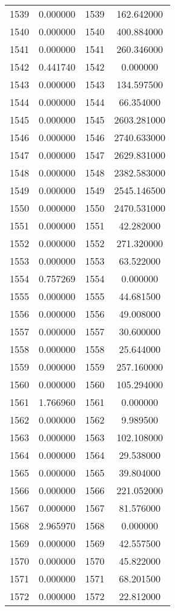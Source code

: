 \documentclass[12pt]{article}
\begin{document}
\begin{longtable}{@{}cccc@{}}
1539 & 0.000000 & 1539 & 162.642000 \\
1540 & 0.000000 & 1540 & 400.884000 \\
1541 & 0.000000 & 1541 & 260.346000 \\
1542 & 0.441740 & 1542 & 0.000000 \\
1543 & 0.000000 & 1543 & 134.597500 \\
1544 & 0.000000 & 1544 & 66.354000 \\
1545 & 0.000000 & 1545 & 2603.281000 \\
1546 & 0.000000 & 1546 & 2740.633000 \\
1547 & 0.000000 & 1547 & 2629.831000 \\
1548 & 0.000000 & 1548 & 2382.583000 \\
1549 & 0.000000 & 1549 & 2545.146500 \\
1550 & 0.000000 & 1550 & 2470.531000 \\
1551 & 0.000000 & 1551 & 42.282000 \\
1552 & 0.000000 & 1552 & 271.320000 \\
1553 & 0.000000 & 1553 & 63.522000 \\
1554 & 0.757269 & 1554 & 0.000000 \\
1555 & 0.000000 & 1555 & 44.681500 \\
1556 & 0.000000 & 1556 & 49.008000 \\
1557 & 0.000000 & 1557 & 30.600000 \\
1558 & 0.000000 & 1558 & 25.644000 \\
1559 & 0.000000 & 1559 & 257.160000 \\
1560 & 0.000000 & 1560 & 105.294000 \\
1561 & 1.766960 & 1561 & 0.000000 \\
1562 & 0.000000 & 1562 & 9.989500 \\
1563 & 0.000000 & 1563 & 102.108000 \\
1564 & 0.000000 & 1564 & 29.538000 \\
1565 & 0.000000 & 1565 & 39.804000 \\
1566 & 0.000000 & 1566 & 221.052000 \\
1567 & 0.000000 & 1567 & 81.576000 \\
1568 & 2.965970 & 1568 & 0.000000 \\
1569 & 0.000000 & 1569 & 42.557500 \\
1570 & 0.000000 & 1570 & 45.822000 \\
1571 & 0.000000 & 1571 & 68.201500 \\
1572 & 0.000000 & 1572 & 22.812000 \\

\end{longtable}
\end{document}
